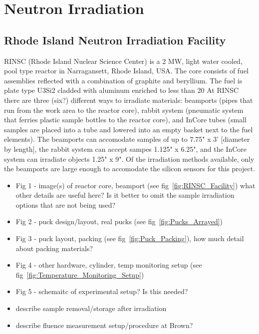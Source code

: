 \section{Neutron Irradiation}
\label{sec:irradiation}

\subsection{Rhode Island Neutron Irradiation Facility}
\label{subsec:RINSC}
RINSC (Rhode Island Nuclear Science Center) is a 2 MW, light water cooled, pool type reactor in Narragansett, Rhode Island, USA.
The core consists of fuel assemblies reflected with a combination of graphite and beryllium.
The fuel is plate type U3Si2 cladded with aluminum enriched to less than 20%
At RINSC there are three (six?) different ways to irradiate materials: beamports (pipes that run from the work area to the reactor core), rabbit system (pneumatic system that ferries plastic sample bottles to the reactor core), and InCore tubes (small samples are placed into a tube and lowered into an empty basket next to the fuel elements). 
The beamports can accomodate samples of up to 7.75" x 3' [diameter by length], the rabbit system can accept sampes 1.125" x 6.25", and the InCore system can irradiate objects 1.25" x 9". 
Of the irradiation methods available, only the beamports are large enough to accomodate the silicon sensors for this project.
\begin{itemize}
    \item Fig 1 - image(s) of reactor core, beamport (see fig~\ref{fig:RINSC_Facility})
    what other details are useful here?
    Is it better to omit the sample irradiation options that are not being used?
    \item Fig 2 - puck design/layout, real pucks (see fig~\ref{fig:Pucks_Arrayed})
    \item Fig 3 - puck layout, packing (see fig~\ref{fig:Puck_Packing}), how much detail about packing materials?
    \item Fig 4 - other hardware, cylinder, temp monitoring setup (see fig~\ref{fig:Temperature_Monitoring_Setup})
    \item Fig 5 - schemaitc of experimental setup? Is this needed?
    \item describe sample removal/storage after irradiation
    \item describe fluence measurement setup/procedure at Brown? 
\end{itemize}

